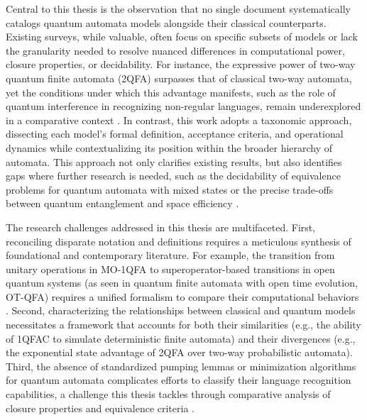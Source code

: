 Central to this thesis is the observation that no single document systematically catalogs quantum automata models alongside their classical counterparts. Existing surveys, while valuable, often focus on specific subsets of models or lack the granularity needed to resolve nuanced differences in computational power, closure properties, or decidability. For instance, the expressive power of two-way quantum finite automata (2QFA) surpasses that of classical two-way automata, yet the conditions under which this advantage manifests, such as the role of quantum interference in recognizing non-regular languages, remain underexplored in a comparative context \cite{yakaryilmaz2010succinctness}. In contrast, this work adopts a taxonomic approach, dissecting each model’s formal definition, acceptance criteria, and operational dynamics while contextualizing its position within the broader hierarchy of automata. This approach not only clarifies existing results, but also identifies gaps where further research is needed, such as the decidability of equivalence problems for quantum automata with mixed states or the precise trade-offs between quantum entanglement and space efficiency \cite{hirvensalo2012quantum}.  

The research challenges addressed in this thesis are multifaceted. First, reconciling disparate notation and definitions requires a meticulous synthesis of foundational and contemporary literature. For example, the transition from unitary operations in MO-1QFA to superoperator-based transitions in open quantum systems (as seen in quantum finite automata with open time evolution, OT-QFA) requires a unified formalism to compare their computational behaviors \cite{bertoni2001quantum}. Second, characterizing the relationships between classical and quantum models necessitates a framework that accounts for both their similarities (e.g., the ability of 1QFAC to simulate deterministic finite automata) and their divergences (e.g., the exponential state advantage of 2QFA over two-way probabilistic automata). Third, the absence of standardized pumping lemmas or minimization algorithms for quantum automata complicates efforts to classify their language recognition capabilities, a challenge this thesis tackles through comparative analysis of closure properties and equivalence criteria \cite{ambainis1998one}.  

